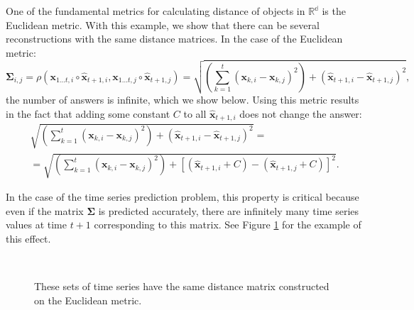 \documentclass[12pt]{article}
\begin{document}
One of the fundamental metrics for calculating distance of objects in $\mathbb{R^d}$ is the Euclidean metric. With this example, we show that there can be several reconstructions with the same distance matrices. In the case of the Euclidean metric:
\[\mathbf{\Sigma}_{i,j} = \rho(\mathbf{x}_{1 \ldots t, i} \circ \hat{\mathbf{x}}_{t+1, i}, \mathbf{x}_{1 \ldots t, j} \circ \hat{\mathbf{x}}_{t+1, j})=\sqrt{\left(\sum_{k=1}^t (\mathbf{x}_{k,i}-\mathbf{x}_{k,j})^2\right) + (\hat{\mathbf{x}}_{t+1, i}-\hat{\mathbf{x}}_{t+1, j})^2},\]
the number of answers is infinite, which we show below.
Using this metric results in the fact that adding some constant $C$ to all $\hat{\mathbf{x}}_{t+1, i}$ does not change the answer:
\begin{gather*}
	\sqrt{\left(\sum_{k=1}^t (\mathbf{x}_{k,i}-\mathbf{x}_{k,j})^2\right) + (\hat{\mathbf{x}}_{t+1, i}-\hat{\mathbf{x}}_{t+1, j})^2} =\\
	= \sqrt{\left(\sum_{k=1}^t (\mathbf{x}_{k,i}-\mathbf{x}_{k,j})^2\right) + [(\hat{\mathbf{x}}_{t+1, i} + C) -(\hat{\mathbf{x}}_{t+1, j} + C)]^2}.
\end{gather*}

In the case of the time series prediction problem, this property is critical because even if the matrix $\mathbf{\Sigma}$ is predicted accurately, there are infinitely many time series values at time $t+1$ corresponding to this matrix. See Figure \ref{fig:fig1} for the example of this effect.
\begin{figure}[!htbp]
	\centering
	\\
	\caption{These sets of time series have the same distance matrix constructed on the Euclidean metric.}
	\label{fig:fig1}
\end{figure}
\end{document}

